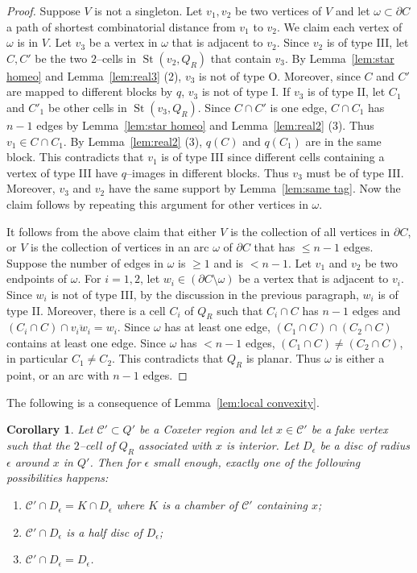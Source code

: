 \documentclass[11pt]{amsart}
\newcommand{\St}{\operatorname{St}}
\newcommand {\C}{\mathcal C}
\newtheorem{corollary}[theorem]{Corollary}
\theoremstyle{definition}
\begin{document}
\begin{proof}
Suppose $V$ is not a singleton. Let $v_1,v_2$ be two vertices of $V$ and let $\omega\subset\partial C$ a path of shortest combinatorial distance from $v_1$ to $v_2$. We claim each vertex of $\omega$ is in $V$. Let $v_3$ be a vertex in $\omega$ that is adjacent to $v_2$. Since $v_2$ is of type III, let $C,C'$ be the two $2$--cells in $\St(v_2,Q_R)$ that contain $v_3$. By Lemma~\ref{lem:star homeo} and Lemma~\ref{lem:real3} (2), $v_3$ is not of type O. Moreover, since $C$ and $C'$ are mapped to different blocks by $q$, $v_3$ is not of type I. If $v_3$ is of type II, let $C_1$ and $C'_1$ be other cells in $\St(v_3,Q_R)$. Since $C\cap C'$ is one edge, $C\cap C_1$ has $n-1$ edges by Lemma~\ref{lem:star homeo} and Lemma~\ref{lem:real2} (3). Thus $v_1\in C\cap C_1$. By Lemma~\ref{lem:real2} (3), $q(C)$ and $q(C_1)$ are in the same block. This contradicts that $v_1$ is of type III since different cells containing a vertex of type III have $q$--images in different blocks. Thus $v_3$ must be of type III. Moreover, $v_3$ and $v_2$ have the same support by Lemma~\ref{lem:same tag}. Now the claim follows by repeating this argument for other vertices in $\omega$.

It follows from the above claim that either $V$ is the collection of all vertices in $\partial C$, or $V$ is the collection of vertices in an arc $\omega$ of $\partial C$ that has $\le n-1$ edges. Suppose the number of edges in $\omega$ is $\ge 1$ and is $<n-1$. Let $v_1$ and $v_2$ be two endpoints of $\omega$. For $i=1,2$, let $w_i\in(\partial C\setminus\omega)$ be a vertex that is adjacent to $v_i$. Since $w_i$ is not of type III, by the discussion in the previous paragraph, $w_i$ is of type II. Moreover, there is a cell $C_i$ of $Q_R$ such that $C_i\cap C$ has $n-1$ edges and $(C_i\cap C)\cap \overline{v_iw_i}=w_i$. Since $\omega$ has at least one edge, $(C_1\cap C)\cap(C_2\cap C)$ contains at least one edge. Since  $\omega$ has $<n-1$ edges, $(C_1\cap C)\neq (C_2\cap C)$, in particular $C_1\neq C_2$. This contradicts that $Q_R$ is planar. Thus $\omega$ is either a point, or an arc with $n-1$ edges.
\end{proof}

The following is a consequence of Lemma~\ref{lem:local convexity}.

\begin{corollary}
	\label{cor:local classification}
Let $\C'\subset Q'$ be a Coxeter region and let $x\in \C'$ be a fake vertex such that the $2$--cell of $Q_R$ associated with $x$ is interior. Let $D_\epsilon$ be a disc of radius $\epsilon$ around $x$ in $Q'$. Then for $\epsilon$ small enough, exactly one of the following possibilities happens:
\begin{enumerate}
	\item $\C'\cap D_{\epsilon}=K\cap D_{\epsilon}$ where $K$ is a chamber of $\C'$ containing $x$;
	\item $\C'\cap D_{\epsilon}$ is a half disc of $D_{\epsilon}$;
	\item $\C'\cap D_\epsilon =D_\epsilon$.
\end{enumerate}
\end{corollary}
\end{document}

